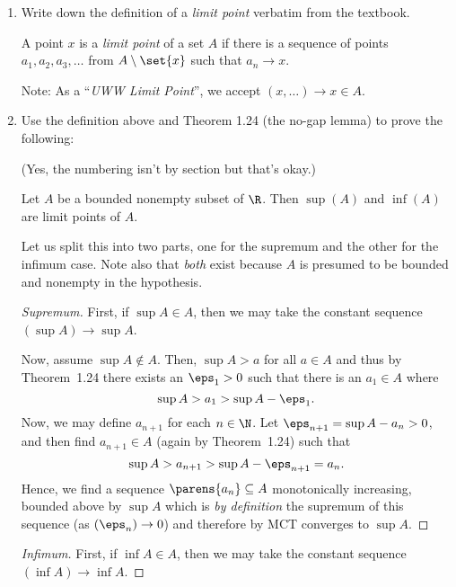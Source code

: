 \documentclass{article}
\begin{document}
\begin{enumerate}
  \item Write down the definition of a \emph{limit point} verbatim from the textbook.

        A point $x$ is a \emph{limit point} of a set $A$ if there is a sequence of points $a_{1}, a_{2}, a_{3}, \ldots$
        from $A \setminus \set{x}$ such that $a_{n} \to x$.

        Note: As a ``\emph{UWW Limit Point}'', we accept $(x, \ldots) \to x \in A$.





  \item Use the definition above and Theorem 1.24 (the no-gap lemma) to prove the following:

        (Yes, the numbering isn't by section but that's okay.)
        \begin{prop} Let $A$ be a bounded nonempty subset of $\R$. Then $\sup(A)$ and $\inf(A)$
          are limit points of $A$.\end{prop}

        Let us split this into two parts, one for the supremum and the other for the infimum case.
        Note also that \emph{both} exist because $A$ is presumed to be bounded and nonempty in the hypothesis.

        \begin{proof}[Supremum]
          First, if $\sup A \in A$, then we may take the constant sequence $(\sup A) \to \sup A$.

          Now, assume $\sup A \notin A$. Then, $\sup A > a$ for all $a \in A$ and thus by Theorem~1.24
          there exists an $\eps_{1} > 0$ such that there is an $a_{1} \in A$ where
          \[ \sup A > a_{1} > \sup A - \eps_{1}. \]
          Now, we may define $a_{n + 1}$ for each $n \in \N$. Let $\eps_{n + 1} = \sup A - a_{n} > 0$,
          and then find $a_{n + 1} \in A$ (again by Theorem~1.24) such that
          \[ \sup A > a_{n + 1} > \sup A - \eps_{n + 1} = a_{n}. \]
          Hence, we find a sequence $\parens{a_{n}} \subseteq A$ monotonically increasing, bounded above by $\sup A$ which is
          \emph{by definition} the supremum of this sequence (as $(\eps_{n}) \to 0$)
          and therefore by MCT converges to $\sup A$.
        \end{proof}

        \begin{proof}[Infimum]
          First, if $\inf A \in A$, then we may take the constant sequence $(\inf A) \to \inf A$.


\end{proof}
\end{enumerate}
\end{document}
